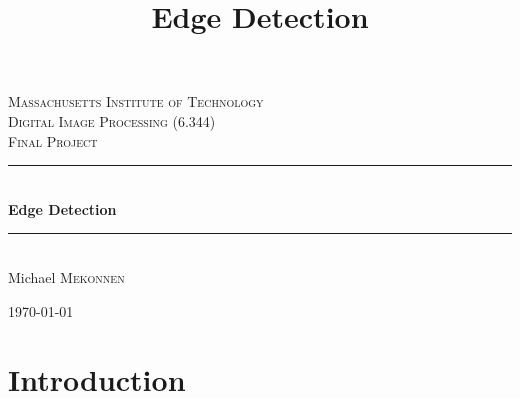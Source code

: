\documentclass[12pt]{amsart}
\title{Edge Detection}
\newcommand{\HRule}{\rule{\linewidth}{0.5mm}}
\begin{document}
\begin{titlepage}
\begin{center}

\textsc{\LARGE Massachusetts Institute of Technology}\\[1.5cm]

\textsc{\Large Digital Image Processing (6.344) \\ Final Project}\\[0.5cm]

\HRule \\[0.4cm]
{ \huge \bfseries Edge Detection}\\[0.4cm]
\HRule \\[1.5cm]

\large Michael \textsc{Mekonnen}

\vfill

{\large \today}

\end{center}
\end{titlepage}

\maketitle

\section{Introduction}
\end{document}
